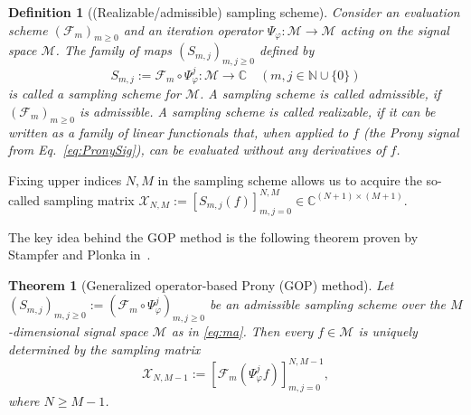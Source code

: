 \documentclass{arxiv}
\newcommand{\C}{\mathbb{C}}
\newcommand{\cM}{\mathcal{M}}
\newtheorem{theorem}{Theorem}[section]
\newtheorem{definition}{Definition}[section]
\begin{document}
\begin{definition}[(Realizable/admissible) sampling scheme]
\label{def:evalscheme}
    Consider an evaluation scheme ${(\mathcal{F}_m)}_{m \ge 0}$ and an iteration operator $\Psi_{\varphi} : \cM \to \cM$ acting on the signal space $\cM$. The family of maps ${(S_{m, j})}_{m,j \ge 0}$ defined by
    $$
        S_{m, j} := \mathcal{F}_{m} \circ \Psi_{\varphi}^{j} : \cM \to \mathbb{C} \quad (m, j \in \mathbb{N} \cup \{0\})
    $$
    is called a \emph{sampling scheme} for $\cM$. A sampling scheme is called \emph{admissible}, if ${(\mathcal{F}_m)}_{m \ge 0}$ is admissible. A sampling scheme is called \emph{realizable}, if it can be written as a family of linear functionals that, when applied to $f$ (the Prony signal from Eq.~\eqref{eq:PronySig}), can be evaluated without any  derivatives of $f$. 
\end{definition}
Fixing upper indices $N,M$ in the sampling scheme allows us to acquire the so-called sampling matrix $\mathcal{X}_{N,M} := \left[ S_{m, j}(f) \right]_{m, j = 0}^{N, M} \in \C^{(N+1) \times (M+1)}$. 

The key idea behind the GOP method is the following theorem proven by Stampfer and Plonka in~\cite{stampfer2020generalized}.

\begin{theorem}[Generalized operator-based Prony (GOP) method]
\label{thm:GOP}
    Let ${(S_{m, j})}_{m,j \ge 0} := {(\mathcal{F}_m \circ \Psi_{\varphi}^{j})}_{m,j \ge 0}$ be an admissible sampling scheme over the $M$-dimensional signal space $\cM$ as in \eqref{eq:ma}. Then every $f \in \cM$ is uniquely determined by the sampling matrix
    \begin{equation}
        \label{eq:sampmat}
        \mathcal{X}_{N,M-1} := \left[ \mathcal{F}_m(\Psi_{\varphi}^{j} f)\right]_{m,j=0}^{N,M-1},
    \end{equation}
    where $N \geq M-1$.
\end{theorem}
\end{document}
